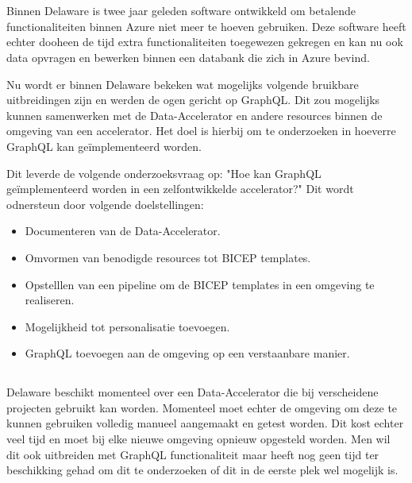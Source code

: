 
\chapter{}%
\label{ch:inleiding}

Binnen Delaware is twee jaar geleden software ontwikkeld om betalende functionaliteiten binnen Azure niet meer te hoeven gebruiken. Deze software heeft echter dooheen de tijd extra functionaliteiten toegewezen gekregen en kan nu ook data opvragen en bewerken binnen een databank die zich in Azure bevind.

Nu wordt er binnen Delaware bekeken wat mogelijks volgende bruikbare uitbreidingen zijn en werden de ogen gericht op GraphQL. Dit zou mogelijks kunnen samenwerken met de Data-Accelerator en andere resources binnen de omgeving van een accelerator. Het doel is hierbij om te onderzoeken in hoeverre GraphQL kan geïmplementeerd worden.

Dit leverde de volgende onderzoeksvraag op: "Hoe kan GraphQL geïmplementeerd worden in een zelfontwikkelde accelerator?" Dit wordt odnersteun door volgende doelstellingen:

\begin{itemize}
  \item Documenteren van de Data-Accelerator.
  \item Omvormen van benodigde resources tot BICEP templates.
  \item Opstelllen van een pipeline om de BICEP templates in een omgeving te realiseren.
  \item Mogelijkheid tot personalisatie toevoegen.
  \item GraphQL toevoegen aan de omgeving op een verstaanbare manier.
\end{itemize}

\section{}%
\label{sec:probleemstelling}

Delaware beschikt momenteel over een Data-Accelerator die bij verscheidene projecten gebruikt kan worden. Momenteel moet echter de omgeving om deze te kunnen gebruiken volledig manueel aangemaakt en getest worden.  Dit kost echter veel tijd en moet bij elke nieuwe omgeving opnieuw opgesteld worden. Men wil dit ook uitbreiden met GraphQL functionaliteit maar heeft nog geen tijd ter beschikking gehad om dit te onderzoeken of dit in de eerste plek wel mogelijk is.


